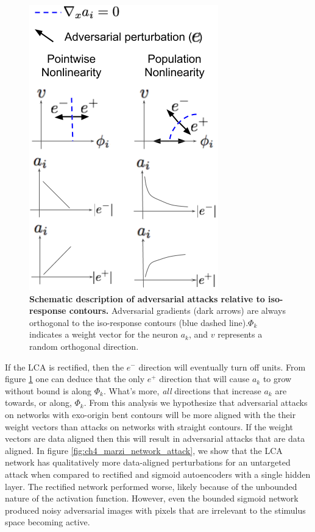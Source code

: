 \begin{figure}
    \begin{center}
    \centerline{\includegraphics[width=0.5\columnwidth]{figures/adversarial_gradients_iso_contours.png}}
    \end{center}
    \caption{\textbf{Schematic description of adversarial attacks relative to iso-response contours.} Adversarial gradients (dark arrows) are always orthogonal to the iso-response contours (blue dashed line).$\Phi_{k}$ indicates a weight vector for the neuron $a_{k}$, and $v$ represents a random orthogonal direction.}
    \label{fig:ch4_adv_grads}
\end{figure}

If the LCA is rectified, then the $e^{-}$ direction will eventually turn off units. From figure \ref{fig:ch4_adv_grads} one can deduce that the only $e^{+}$ direction that will cause $a_{k}$ to grow without bound is along $\Phi_{k}$. What's more, \emph{all} directions that increase $a_{k}$ are towards, or along, $\Phi_{k}$. From this analysis we hypothesize that adversarial attacks on networks with exo-origin bent contours will be more aligned with the their weight vectors than attacks on networks with straight contours. If the weight vectors are data aligned then this will result in adversarial attacks that are data aligned. In figure \ref{fig:ch4_marzi_network_attack}, we show that the LCA network has qualitatively more data-aligned perturbations for an untargeted attack when compared to rectified and sigmoid autoencoders with a single hidden layer. The rectified network performed worse, likely because of the unbounded nature of the activation function. However, even the bounded sigmoid network produced noisy adversarial images with pixels that are irrelevant to the stimulus space becoming active.

